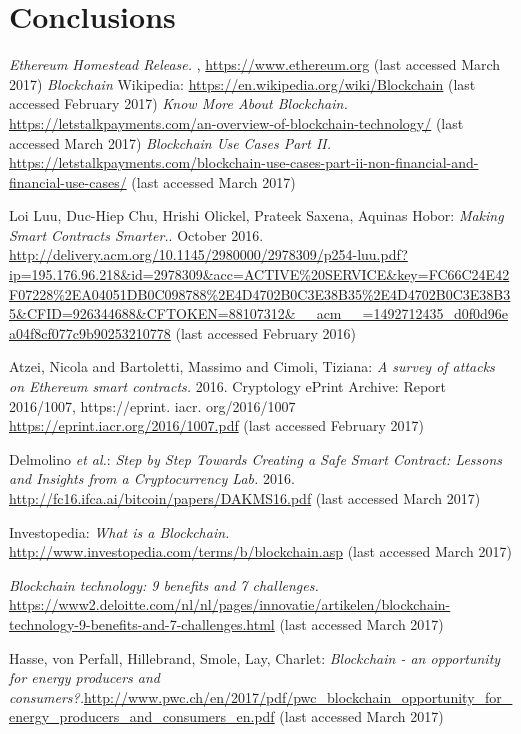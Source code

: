 \section{Conclusions}




\begin{thebibliography}{99}
\emph{Ethereum Homestead Release.} , \url{https://www.ethereum.org} (last accessed March 2017)
\emph{Blockchain} Wikipedia: \url{https://en.wikipedia.org/wiki/Blockchain} (last accessed February 2017)
\emph{Know More About Blockchain.} \url{https://letstalkpayments.com/an-overview-of-blockchain-technology/} (last accessed March 2017)
\emph{Blockchain Use Cases Part II.} \url{https://letstalkpayments.com/blockchain-use-cases-part-ii-non-financial-and-financial-use-cases/} (last accessed March 2017)


Loi Luu, Duc-Hiep Chu, Hrishi Olickel, Prateek Saxena, Aquinas Hobor: \emph{Making Smart Contracts Smarter.}. October 2016. \url{http://delivery.acm.org/10.1145/2980000/2978309/p254-luu.pdf?ip=195.176.96.218&id=2978309&acc=ACTIVE\%20SERVICE&key=FC66C24E42F07228\%2EA04051DB0C098788\%2E4D4702B0C3E38B35\%2E4D4702B0C3E38B35&CFID=926344688&CFTOKEN=88107312&__acm__=1492712435_d0f0d96ea04f8cf077c9b90253210778} (last accessed February 2016)

Atzei, Nicola and Bartoletti, Massimo and Cimoli, Tiziana: \emph{A survey of attacks on Ethereum smart contracts.} 2016. Cryptology ePrint Archive: Report 2016/1007, https://eprint. iacr. org/2016/1007 \url{https://eprint.iacr.org/2016/1007.pdf} (last accessed February 2017)


Delmolino \textit{et al.}: \emph{Step by Step Towards Creating a Safe Smart Contract: Lessons and Insights from a Cryptocurrency Lab.} 2016.  \url{http://fc16.ifca.ai/bitcoin/papers/DAKMS16.pdf} (last accessed March 2017)




Investopedia: \emph{What is a Blockchain.} \url{http://www.investopedia.com/terms/b/blockchain.asp} (last accessed March 2017)

\emph{Blockchain technology: 9 benefits and 7 challenges.} \url{https://www2.deloitte.com/nl/nl/pages/innovatie/artikelen/blockchain-technology-9-benefits-and-7-challenges.html} (last accessed March 2017)

Hasse, von Perfall, Hillebrand, Smole, Lay, Charlet: \emph{Blockchain - an opportunity for energy producers and consumers?.}\url{http://www.pwc.ch/en/2017/pdf/pwc_blockchain_opportunity_for_energy_producers_and_consumers_en.pdf} (last accessed March 2017)


\end{thebibliography}
